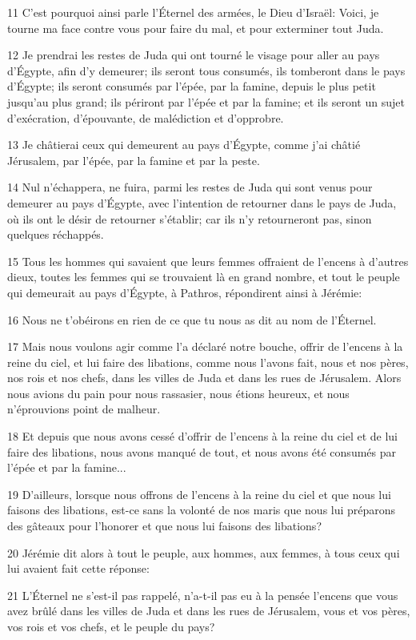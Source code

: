 \par 11 C'est pourquoi ainsi parle l'Éternel des armées, le Dieu d'Israël: Voici, je tourne ma face contre vous pour faire du mal, et pour exterminer tout Juda.
\par 12 Je prendrai les restes de Juda qui ont tourné le visage pour aller au pays d'Égypte, afin d'y demeurer; ils seront tous consumés, ils tomberont dans le pays d'Égypte; ils seront consumés par l'épée, par la famine, depuis le plus petit jusqu'au plus grand; ils périront par l'épée et par la famine; et ils seront un sujet d'exécration, d'épouvante, de malédiction et d'opprobre.
\par 13 Je châtierai ceux qui demeurent au pays d'Égypte, comme j'ai châtié Jérusalem, par l'épée, par la famine et par la peste.
\par 14 Nul n'échappera, ne fuira, parmi les restes de Juda qui sont venus pour demeurer au pays d'Égypte, avec l'intention de retourner dans le pays de Juda, où ils ont le désir de retourner s'établir; car ils n'y retourneront pas, sinon quelques réchappés.
\par 15 Tous les hommes qui savaient que leurs femmes offraient de l'encens à d'autres dieux, toutes les femmes qui se trouvaient là en grand nombre, et tout le peuple qui demeurait au pays d'Égypte, à Pathros, répondirent ainsi à Jérémie:
\par 16 Nous ne t'obéirons en rien de ce que tu nous as dit au nom de l'Éternel.
\par 17 Mais nous voulons agir comme l'a déclaré notre bouche, offrir de l'encens à la reine du ciel, et lui faire des libations, comme nous l'avons fait, nous et nos pères, nos rois et nos chefs, dans les villes de Juda et dans les rues de Jérusalem. Alors nous avions du pain pour nous rassasier, nous étions heureux, et nous n'éprouvions point de malheur.
\par 18 Et depuis que nous avons cessé d'offrir de l'encens à la reine du ciel et de lui faire des libations, nous avons manqué de tout, et nous avons été consumés par l'épée et par la famine...
\par 19 D'ailleurs, lorsque nous offrons de l'encens à la reine du ciel et que nous lui faisons des libations, est-ce sans la volonté de nos maris que nous lui préparons des gâteaux pour l'honorer et que nous lui faisons des libations?
\par 20 Jérémie dit alors à tout le peuple, aux hommes, aux femmes, à tous ceux qui lui avaient fait cette réponse:
\par 21 L'Éternel ne s'est-il pas rappelé, n'a-t-il pas eu à la pensée l'encens que vous avez brûlé dans les villes de Juda et dans les rues de Jérusalem, vous et vos pères, vos rois et vos chefs, et le peuple du pays?
